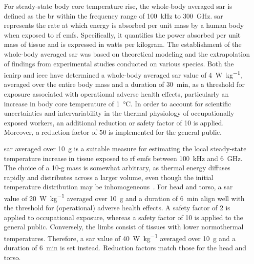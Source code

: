 For steady-state body core temperature rise, the whole-body averaged \gls{sar} is defined as the \gls{br} within the frequency range of \SI{100}{\kHz} to \SI{300}{\GHz}.
\Gls{sar} represents the rate at which energy is absorbed per unit mass by a human body when exposed to \gls{rf} \gls{emf}s.
Specifically, it quantifies the power absorbed per unit mass of tissue and is expressed in watts per kilogram.
The establishment of the whole-body averaged \gls{sar} was based on theoretical modeling and the extrapolation of findings from experimental studies conducted on various species.
Both the \gls{icnirp} and \gls{ieee} have determined a whole-body averaged \gls{sar} value of \SI{4}{\watt\per\kg}, averaged over the entire body mass and a duration of \SI{30}{\minute}, as a threshold for exposure associated with operational adverse health effects, particularly an increase in body core temperature of \SI{1}{\celsius}.
In order to account for scientific uncertainties and intervariability in the thermal physiology of occupationally exposed workers, an additional reduction or safety factor of \num{10} is applied.
Moreover, a reduction factor of \num{50} is implemented for the general public.

\Gls{sar} averaged over \SI{10}{\g} is a suitable measure for estimating the local steady-state temperature increase in tissue exposed to \gls{rf} \gls{emf}s between \SI{100}{\kHz} and \SI{6}{\GHz}.
The choice of a 10-g mass is somewhat arbitrary, as thermal energy diffuses rapidly and distributes across a larger volume, even though the initial temperature distribution may be inhomogeneous~\cite{Hirata2009correlation}.
For head and torso, a \gls{sar} value of \SI{20}{\watt\per\kg} averaged over \SI{10}{\g} and a duration of \SI{6}{\minute} align well with the threshold for (operational) adverse health effects.
A safety factor of \num{2} is applied to occupational exposure, whereas a safety factor of \num{10} is applied to the general public.
Conversely, the limbs consist of tissues with lower normothermal temperatures.
Therefore, a \gls{sar} value of \SI{40}{\watt\per\kg} averaged over \SI{10}{\g} and a duration of \SI{6}{\minute} is set instead.
Reduction factors match those for the head and torso.

